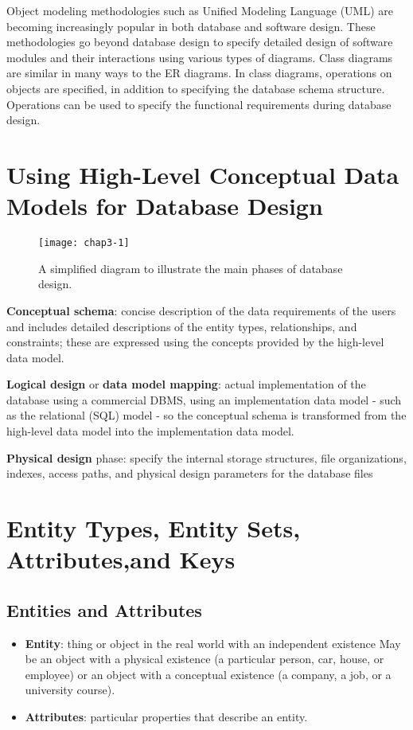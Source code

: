 

    Object modeling methodologies such as Unified Modeling Language (UML) are becoming increasingly popular in both database and software design. These methodologies go beyond database design to specify detailed design of software modules and their interactions using various types of diagrams. Class diagrams are similar in many ways to the ER diagrams. In class diagrams, operations on objects are specified, in addition to specifying the database schema structure. Operations can be used to specify the functional requirements during database design.

\section{Using High-Level Conceptual Data Models for Database Design}
    
    \begin{figure}
        \centering
        \texttt{[image: chap3-1]}
        \caption{A simplified diagram to illustrate the main phases of database design.}
        \label{fig:chap3-1}
    \end{figure}
    
    \textbf{Conceptual schema}: concise description of the data requirements of the users and includes detailed descriptions of the entity types, relationships, and constraints; these are expressed using the concepts provided by the high-level data model.
    
    \textbf{Logical design} or \textbf{data model mapping}: actual implementation of the database using
    a commercial DBMS, using an implementation data model - such as the relational (SQL) model - so the conceptual schema is transformed from the high-level data model into the implementation data model.
    
    \textbf{Physical design} phase: specify the internal storage structures, file organizations, indexes, access paths, and physical design parameters for the database files

\section{Entity Types, Entity Sets, Attributes,and Keys}
    \subsection{Entities and Attributes}
    \begin{itemize}
        \item \textbf{Entity}: thing or object in the real world with an independent existence
    May be an object with a physical existence (a particular person, car, house, or employee) or an object with a conceptual existence (a company, a job, or a university course). 
        \item \textbf{Attributes}: particular properties that describe an entity. 
    \end{itemize}
    
